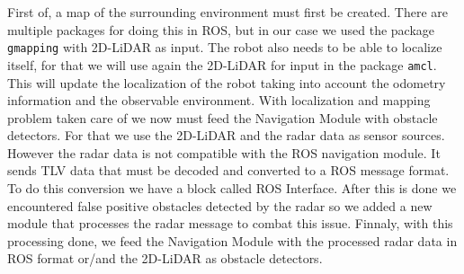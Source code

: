 First of, a map of the surrounding  environment must first be created.  There are multiple packages for doing this in \ac{ROS}, but in our case we used the package \texttt{gmapping} with 2D-\ac{LiDAR} as input. The robot also needs to be able to localize itself, for that we will use again the 2D-\ac{LiDAR} for input in the package \texttt{amcl}. This will update the localization of the robot taking into account the odometry information and the observable environment. With localization and mapping problem taken care of we now must feed the Navigation Module with obstacle detectors. For that we use the 2D-LiDAR and the radar data as sensor sources.
 However the radar data is not compatible with the \ac{ROS} navigation module. It sends \ac{TLV} data that must be decoded and converted to a \ac{ROS} message format. To do this conversion we have a block called \ac{ROS} Interface. After this is done we encountered false positive obstacles detected by the radar so we added a new module that processes the radar message to combat this issue. Finnaly, with this processing done, we feed the Navigation Module with the processed radar data in \ac{ROS} format or/and the 2D-\ac{LiDAR} as obstacle detectors. 





